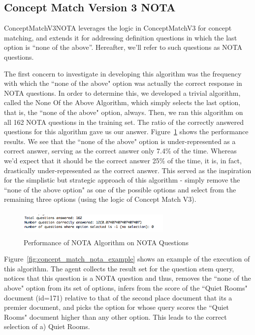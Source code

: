 \subsection{Concept Match Version 3 NOTA}

ConceptMatchV3NOTA leverages the logic in ConceptMatchV3 for concept matching, and extends it for addressing definition questions in which the last option is ``none of the above''.  Hereafter, we'll refer to such questions as NOTA questions.

The first concern to investigate in developing this algorithm was the frequency with which the ``none of the above" option was actually the correct response in NOTA questions.  In order to determine this, we developed a trivial algorithm, called the None Of the Above Algorithm, which simply selects the last option, that is, the ``none of the above" option, always.  Then, we ran this algorithm on all 162 NOTA questions in the training set.  The ratio of the correctly answered questions for this algorithm gave us our answer.  Figure~\ref{fig:nota_training_set_performance} shows the performance results.  We see that the ``none of the above" option is under-represented as a correct answer, serving as the correct answer only 7.4\% of the time.  Whereas we'd expect that it should be the correct answer 25\% of the time, it is, in fact, drastically under-represented as the correct answer.  This served as the inspiration for the simplistic but strategic approach of this algorithm - simply remove the ``none of the above option" as one of the possible options and select from the remaining three options (using the logic of Concept Match V3).

\begin{figure}
\centering
\vspace{0.75in}
\includegraphics[width=75mm, height=13mm]{nota_training_set_performance.png}
\caption{Performance of NOTA Algorithm on NOTA Questions}
\label{fig:nota_training_set_performance}
\end{figure}


Figure~\ref{fig:concept_match_nota_example} shows an example of the execution of this algorithm.  The agent collects the result set for the question stem query, notices that this question is a NOTA question and thus, removes the ``none of the above" option from its set of options, infers from the score of the ``Quiet Rooms" document (id=171) relative to that of the second place document that its a premier document, and picks the option for whose query scores the ``Quiet Rooms" document higher than any other option.  This leads to the correct selection of a) Quiet Rooms.


